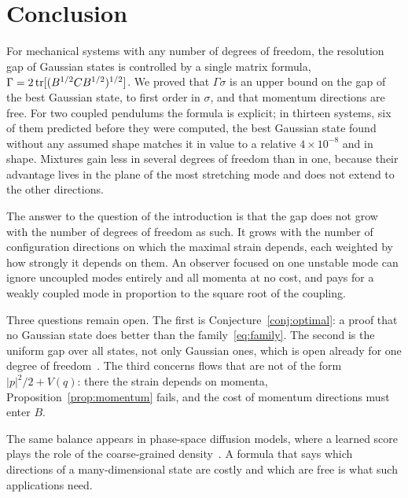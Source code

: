 \section{Conclusion}
\label{sec:conclusion}

For mechanical systems with any number of degrees of freedom, the resolution gap of Gaussian states is controlled by a single matrix formula, $\Gamma = 2\operatorname{tr}[(B^{1/2}CB^{1/2})^{1/2}]$. We proved that $\Gamma\sigma$ is an upper bound on the gap of the best Gaussian state, to first order in $\sigma$, and that momentum directions are free. For two coupled pendulums the formula is explicit; in thirteen systems, six of them predicted before they were computed, the best Gaussian state found without any assumed shape matches it in value to a relative $4\times10^{-8}$ and in shape. Mixtures gain less in several degrees of freedom than in one, because their advantage lives in the plane of the most stretching mode and does not extend to the other directions.

The answer to the question of the introduction is that the gap does not grow with the number of degrees of freedom as such. It grows with the number of configuration directions on which the maximal strain depends, each weighted by how strongly it depends on them. An observer focused on one unstable mode can ignore uncoupled modes entirely and all momenta at no cost, and pays for a weakly coupled mode in proportion to the square root of the coupling.

Three questions remain open. The first is Conjecture~\ref{conj:optimal}: a proof that no Gaussian state does better than the family~\eqref{eq:family}. The second is the uniform gap over all states, not only Gaussian ones, which is open already for one degree of freedom~\cite{namba2026gap}. The third concerns flows that are not of the form $|p|^2/2 + V(q)$: there the strain depends on momenta, Proposition~\ref{prop:momentum} fails, and the cost of momentum directions must enter $B$.

The same balance appears in phase-space diffusion models, where a learned score plays the role of the coarse-grained density~\cite{namba2026threshold}. A formula that says which directions of a many-dimensional state are costly and which are free is what such applications need.
